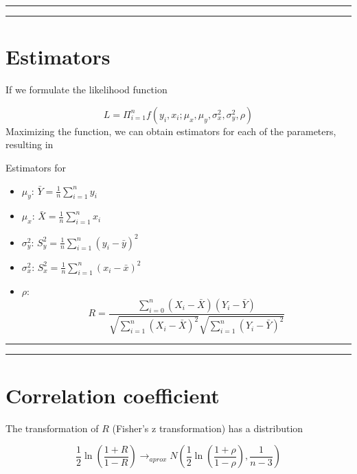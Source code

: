 \documentclass[
]{book}
\providecommand{\tightlist}{%
  \setlength{\itemsep}{0pt}\setlength{\parskip}{0pt}}
\begin{document}
\begin{center}\rule{0.5\linewidth}{0.5pt}\end{center}

\begin{center}\rule{0.5\linewidth}{0.5pt}\end{center}

\hypertarget{estimators}{%
\section{Estimators}\label{estimators}}

If we formulate the likelihood function

\[L=\Pi_{i=1}^n f(y_i,x_i; \mu_x, \mu_y, \sigma^2_x, \sigma_y^2, \rho)\]
Maximizing the function, we can obtain estimators for each of the parameters, resulting in

Estimators for

\begin{itemize}
\tightlist
\item
  \(\mu_y\): \(\bar{Y}=\frac{1}{n}\sum_{i=1}^n y_i\)
\item
  \(\mu_x\): \(\bar{X}=\frac{1}{n}\sum_{i=1}^n x_i\)
\item
  \(\sigma^2_y\): \(S^2_y=\frac{1}{n}\sum_{i=1}^n (y_i-\bar{y})^2\)
\item
  \(\sigma^2_x\): \(S^2_x=\frac{1}{n}\sum_{i=1}^n (x_i-\bar{x})^2\)
\item
  \(\rho\): \[R=\frac{\sum_{i=0}^n(X_i-\bar{X})(Y_i-\bar{Y})}{\sqrt{\sum_{i=1}^n(X_i-\bar{X})^2}\sqrt{\sum_{i=1}^n(Y_i-\bar{Y})^2}}\]
\end{itemize}

\begin{center}\rule{0.5\linewidth}{0.5pt}\end{center}

\begin{center}\rule{0.5\linewidth}{0.5pt}\end{center}

\hypertarget{correlation-coefficient}{%
\section{Correlation coefficient}\label{correlation-coefficient}}

The transformation of \(R\) (Fisher's z transformation) has a distribution

\[\frac{1}{2}\ln (\frac{1+R}{1-R}) \rightarrow_{aprox} N(\frac{1}{2}\ln (\frac{1+\rho}{1-\rho}), \frac{1}{n-3})\]
\end{document}
